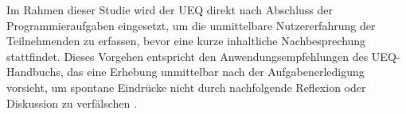 Im Rahmen dieser Studie wird der UEQ direkt nach Abschluss der Programmieraufgaben eingesetzt, um die unmittelbare Nutzererfahrung der Teilnehmenden zu erfassen, bevor eine kurze inhaltliche Nachbesprechung stattfindet. Dieses Vorgehen entspricht den Anwendungsempfehlungen des UEQ-Handbuchs, das eine Erhebung unmittelbar nach der Aufgabenerledigung vorsieht, um spontane Eindrücke nicht durch nachfolgende Reflexion oder Diskussion zu verfälschen \parencite[S.~8]{Schrepp2023UEQHandbook}.
